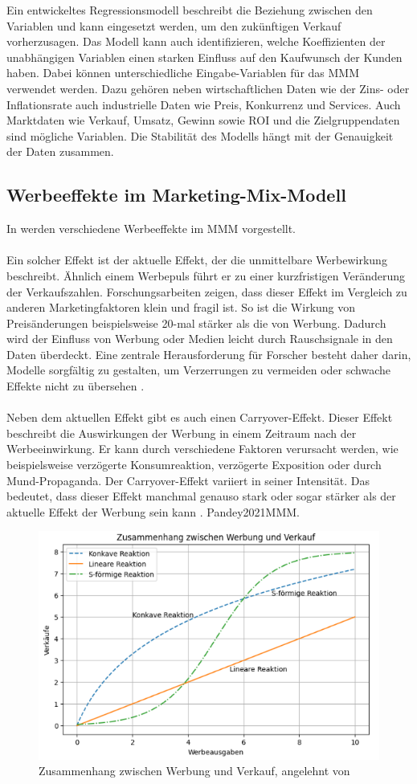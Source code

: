 Ein entwickeltes Regressionsmodell beschreibt die Beziehung zwischen den Variablen und kann eingesetzt werden, um den zukünftigen Verkauf vorherzusagen. Das Modell kann auch identifizieren, welche Koeffizienten der unabhängigen Variablen einen starken Einfluss auf den Kaufwunsch der Kunden haben. Dabei können unterschiedliche Eingabe-Variablen für das \ac{MMM} verwendet werden. Dazu gehören neben wirtschaftlichen Daten wie der Zins- oder Inflationsrate auch industrielle
Daten wie Preis, Konkurrenz und Services. Auch Marktdaten wie Verkauf, Umsatz, Gewinn sowie \ac{ROI} und die Zielgruppendaten sind mögliche Variablen. Die Stabilität des Modells hängt mit der Genauigkeit der Daten zusammen. 
\subsection{Werbeeffekte im Marketing-Mix-Modell}
\label{WerbeeffekteImMMM}
In \cite{Pandey2021MMM} werden verschiedene Werbeeffekte im \ac{MMM} vorgestellt.\\\\
Ein solcher Effekt ist der aktuelle Effekt, der die unmittelbare Werbewirkung beschreibt. Ähnlich einem Werbepuls führt er zu einer kurzfristigen Veränderung der Verkaufszahlen. Forschungsarbeiten zeigen, dass dieser Effekt im Vergleich zu anderen Marketingfaktoren klein und fragil ist. So ist die Wirkung von Preisänderungen beispielsweise 20-mal stärker als die von Werbung. Dadurch wird der Einfluss von Werbung oder Medien leicht durch Rauschsignale in den Daten überdeckt. Eine zentrale Herausforderung für Forscher besteht daher darin, Modelle sorgfältig zu gestalten, um Verzerrungen zu vermeiden oder schwache Effekte nicht zu übersehen \cite[785]{Pandey2021MMM}. \\\\
Neben dem aktuellen Effekt gibt es auch einen Carryover-Effekt. Dieser Effekt beschreibt die Auswirkungen der Werbung in einem Zeitraum nach der Werbeeinwirkung. Er kann durch verschiedene Faktoren verursacht werden, wie beispielsweise verzögerte Konsumreaktion, verzögerte Exposition oder durch Mund-Propaganda. Der Carryover-Effekt variiert in seiner Intensität. Das bedeutet, dass dieser Effekt manchmal genauso stark oder sogar stärker als der aktuelle Effekt der Werbung sein kann \cite[785]{Pandey2021MMM}.
{Pandey2021MMM}.
\begin{figure}[H]
    \centering
    \includegraphics[width=0.75\linewidth]{images/formeffekt.png}
    \caption{Zusammenhang zwischen Werbung und Verkauf, angelehnt von \cite[1]{Pandey2021MMM}}
    \label{fig:formeffekt}
\end{figure}
